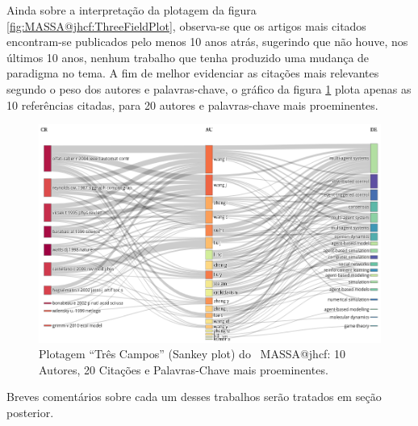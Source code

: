 Ainda sobre a interpretação da plotagem da figura \ref{fig:MASSA@jhcf:ThreeFieldPlot}, observa-se que os artigos mais citados encontram-se publicados pelo menos 10 anos atrás, sugerindo que não houve, nos últimos 10 anos, nenhum trabalho que tenha produzido uma mudança de paradigma no tema.
A fim de melhor evidenciar as citações mais relevantes segundo o peso dos autores e palavras-chave, o gráfico da figura \ref{fig:MASSA@jhcf:ThreeFieldPlot:10-20-20} plota apenas as 10 referências citadas, para 20 autores e palavras-chave mais proeminentes.

\begin{figure}
    \centering
    \includegraphics[angle=0,width=1\textwidth]{experiments/jhcf/PesqBibliogr/SimulacaoMultiagente/WoS-20210803/classico-mais-citacoes/Dataset/ThreeFieldPlot-AU-CR-DE-20-10-20.png}
    \caption{Plotagem ``Três Campos'' (Sankey plot) do \dataset\   MASSA@jhcf: 10 Autores, 20 Citações e Palavras-Chave mais proeminentes.}
    \label{fig:MASSA@jhcf:ThreeFieldPlot:10-20-20}
\end{figure}

Breves comentários sobre cada um desses trabalhos serão tratados em seção posterior.


